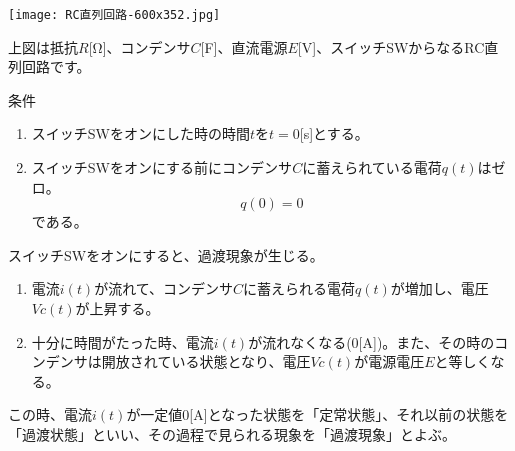 \documentclass[10pt,dvipdfmx]{article}[b5paper]
\begin{document}
\texttt{[image: RC直列回路-600x352.jpg]}

上図は抵抗$R$[Ω]、コンデンサ$C$[F]、直流電源$E$[V]、スイッチSWからなるRC直列回路です。

\begin{kousiki}{条件}
\vspace{2mm}
 \begin{enumerate}
        \item スイッチSWをオンにした時の時間$t$を$t=0$[s]とする。
\vspace{2mm}
        \item スイッチSWをオンにする前にコンデンサ$C$に蓄えられている電荷$q(t)$はゼロ。\\\[q(0)=0\]である。
    \end{enumerate}
\end{kousiki}
スイッチSWをオンにすると、過渡現象が生じる。
\begin{tcolorbox}
 \begin{enumerate}
        \item 電流$i(t)$が流れて、コンデンサ$C$に蓄えられる電荷$q(t)$が増加し、電圧$Vc(t)$が上昇する。
\vspace{2mm}
        \item 十分に時間がたった時、電流$i(t)$が流れなくなる(0[A])。また、その時のコンデンサは開放されている状態となり、電圧$Vc(t)$が電源電圧$E$と等しくなる。
\end{enumerate}
\end{tcolorbox}
この時、電流$i(t)$が一定値0[A]となった状態を「定常状態」、それ以前の状態を「過渡状態」といい、その過程で見られる現象を「過渡現象」とよぶ。
\end{document}
